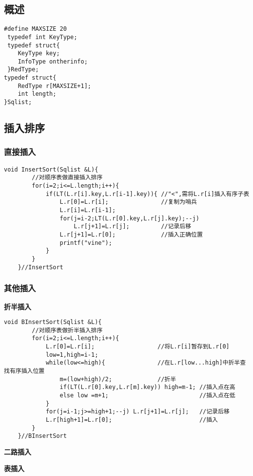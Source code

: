 \documentclass[UTF8]{ctexart}
\newcommand{\mb}[1]{\textbf{#1}}
\newcommand{\p}{\par}
\begin{document}
\subsection{概述}

\begin{lstlisting}[style=v1]
 #define MAXSIZE 20
 typedef int KeyType;
 typedef struct{
    KeyType key;
    InfoType ontherinfo;
 }RedType;
typedef struct{
    RedType r[MAXSIZE+1];
    int length;
}Sqlist;
\end{lstlisting}


\subsection{插入排序}
\subsubsection{直接插入}

\begin{lstlisting}[style=v1]
    void InsertSort(Sqlist &L){
        //对顺序表做直接插入排序
        for(i=2;i<=L.length;i++){
            if(LT(L.r[i].key,L.r[i-1].key)){ //"<",需将L.r[i]插入有序子表
                L.r[0]=L.r[i];               //复制为哨兵
                L.r[i]=L.r[i-1];
                for(j=i-2;LT(L.r[0].key,L.r[j].key);--j)
                    L.r[j+1]=L.r[j];         //记录后移  
                L.r[j+1]=L.r[0];             //插入正确位置
                printf("vine");
            }
        }
    }//InsertSort
\end{lstlisting}

\subsubsection{其他插入}

\mb{折半插入}
\begin{lstlisting}[style=v1]
    void BInsertSort(Sqlist &L){
        //对顺序表做折半插入排序
        for(i=2;i<=L.length;i++){
            L.r[0]=L.r[i];                  //将L.r[i]暂存到L.r[0]
            low=1,high=i-1;
            while(low<=high){               //在L.r[low...high]中折半查找有序插入位置
                m=(low+high)/2;             //折半
                if(LT(L.r[0].key,L.r[m].key)) high=m-1; //插入点在高
                else low =m+1;                          //插入点在低   
            }
            for(j=i-1;j>=high+1;--j) L.r[j+1]=L.r[j];   //记录后移
            L.r[high+1]=L.r[0];                         //插入
        }
    }//BInsertSort
\end{lstlisting}\p
\mb{二路插入}\p
\mb{表插入}\p
\end{document}
